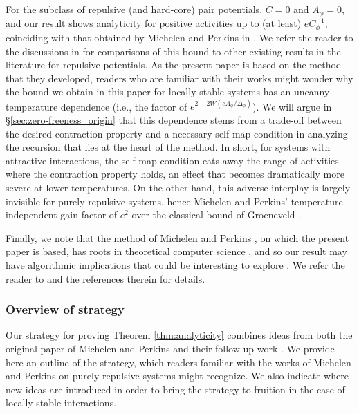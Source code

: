\documentclass[11pt]{article}
\newcommand{\pwcc}{\Delta_{\phi}}
\newcommand{\aconst}{A_{\phi}}
\newcommand{\lsconst}{C}
\numberwithin{equation}{section}
\theoremstyle{plain}
\theoremstyle{definition}
\theoremstyle{remark}
\begin{document}
For the subclass of repulsive (and hard-core) pair potentials, $\lsconst=0$ and $\aconst=0$, and our result shows analyticity for positive activities up to (at least) $eC_{\phi}^{-1}$, coinciding with that obtained by Michelen and Perkins in \cite{michelen2021potential}. 
We refer the reader to the discussions in \cite{michelen2021potential,michelen2023analyticity} for comparisons of this bound to other existing results in the literature for repulsive potentials.
As the present paper is based on the method that they developed, readers who are familiar with their works might wonder why the bound we obtain in this paper for locally stable systems has an uncanny temperature dependence (i.e., the factor of $e^{2-2W(e\aconst/\pwcc)}$).
We will argue in \S\ref{sec:zero-freeness_origin} that this dependence stems from a trade-off between the desired contraction property and a necessary self-map condition in analyzing the recursion that lies at the heart of the method.
In short, for systems with attractive interactions, the self-map condition eats away the range of activities where the contraction property holds, an effect that becomes dramatically more severe at lower temperatures.
On the other hand, this adverse interplay is largely invisible for purely repulsive systems, hence Michelen and Perkins' temperature-independent gain factor of $e^{2}$ over the classical bound of Groeneveld \cite{groeneveld1962two}.

Finally, we note that the method of Michelen and Perkins \cite{michelen2021potential,michelen2023analyticity}, on which the present paper is based, has roots in theoretical computer science \cite{weitz2006counting}, and so our result may have algorithmic implications that could be interesting to explore \cite{jenssen2024quasipolynomial,michelen2022strong,sinclair2017spatial}.
We refer the reader to \cite[\S1.4]{michelen2023analyticity} and the references therein for details.



\subsubsection{Overview of strategy}
\label{sec:introduction_model_strategy}

Our strategy for proving Theorem \ref{thm:analyticity} combines ideas from both the original paper of Michelen and Perkins \cite{michelen2021potential} and their follow-up work \cite{michelen2023analyticity}.
We provide here an outline of the strategy, which readers familiar with the works of Michelen and Perkins on purely repulsive systems might recognize.
We also indicate where new ideas are introduced in order to bring the strategy to fruition in the case of locally stable interactions.
\end{document}
